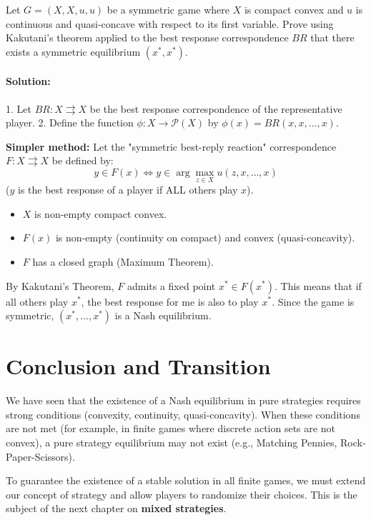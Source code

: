 \begin{exercice}
Let $G = (X, X, u, u)$ be a symmetric game where $X$ is compact convex and $u$ is continuous and quasi-concave with respect to its first variable. Prove using Kakutani's theorem applied to the best response correspondence $BR$ that there exists a symmetric equilibrium $(x^*, x^*)$.
\paragraph{Solution:}
1. Let $BR : X \rightrightarrows X$ be the best response correspondence of the representative player.
2. Define the function $\phi : X \to \mathcal{P}(X)$ by $\phi(x) = BR(x, x, \dots, x)$.
   
   \textbf{Simpler method:}
   Let the "symmetric best-reply reaction" correspondence $F: X \rightrightarrows X$ be defined by:
   $$ y \in F(x) \iff y \in \arg\max_{z \in X} u(z, x, \dots, x) $$
   ($y$ is the best response of a player if ALL others play $x$).
   
   \begin{itemize}
       \item $X$ is non-empty compact convex.
       \item $F(x)$ is non-empty (continuity on compact) and convex (quasi-concavity).
       \item $F$ has a closed graph (Maximum Theorem).
   \end{itemize}
   By Kakutani's Theorem, $F$ admits a fixed point $x^* \in F(x^*)$.
   This means that if all others play $x^*$, the best response for me is also to play $x^*$.
   Since the game is symmetric, $(x^*, \dots, x^*)$ is a Nash equilibrium.
\end{exercice}

\section{Conclusion and Transition}
We have seen that the existence of a Nash equilibrium in pure strategies requires strong conditions (convexity, continuity, quasi-concavity). When these conditions are not met (for example, in finite games where discrete action sets are not convex), a pure strategy equilibrium may not exist (e.g., Matching Pennies, Rock-Paper-Scissors).

To guarantee the existence of a stable solution in all finite games, we must extend our concept of strategy and allow players to randomize their choices. This is the subject of the next chapter on \textbf{mixed strategies}.
